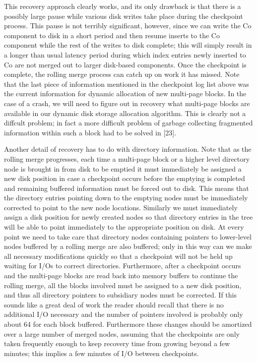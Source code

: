 \documentclass[a4paper,11pt,notitlepage,twoside,openright]{article}
\begin{document}
This recovery approach clearly works, and its only drawback is that
there is a possibly large pause while various disk writes take place
during the checkpoint process. This pause is not terribly significant,
however, since we can write the Co component to disk in a short period
and then resume inserts to the Co component while the rest of the writes
to disk complete; this will simply result in a longer than usual latency
period during which index entries newly inserted to Co are not merged
out to larger disk-based components. Once the checkpoint is complete,
the rolling merge process can catch up on work it has missed. Note that
the last piece of information mentioned in the checkpoint log list above
was the current information for dynamic allocation of new multi-page
blocks. In the case of a crash, we will need to figure out in recovery
what multi-page blocks are available in our dynamic disk storage
allocation algorithm. This is clearly not a diffcult problem; in fact a
more difficult problem of garbage collecting fragmented information
within such a block had to be solved in {[}23{]}.

Another detail of recovery has to do with directory information. Note
that as the rolling merge progresses, each time a multi-page block or a
higher level directory node is brought in from disk to be emptied it
must immediately be assigned a new disk position in case a checkpoint
occurs before the emptying is completed and remaining buffered
information must be forced out to disk. This means that the directory
entries pointing down to the emptying nodes must be immediately
corrected to point to the new node locations. Similarly we must
immediately assign a disk position for newly created nodes so that
directory entries in the tree will be able to point immediately to the
appropriate position on disk. At every point we need to take care that
directory nodes containing pointers to lower-level nodes buffered by a
rolling merge are also buffered; only in this way can we make all
necessary modifications quickly so that a checkpoint will not be held up
waiting for I/Os to correct directories. Furthermore, after a checkpoint
occurs and the multi-page blocks are read back into memory buffers to
continue the rolling merge, all the blocks involved must be assigned to
a new disk position, and thus all directory pointers to subsidiary nodes
must be corrected. If this sounds like a great deal of work the reader
should recall that there is no additional I/O necessary and the number
of pointers involved is probably only about 64 for each block buffered.
Furthermore these changes should be amortized over a large number of
merged nodes, assuming that the checkpoints are only taken frequently
enough to keep recovery time from growing beyond a few minutes; this
implies a few minutes of I/O between checkpoints.
\end{document}
